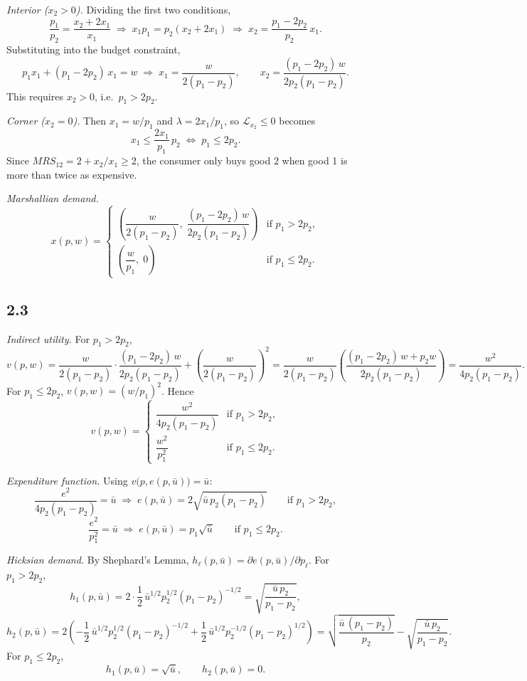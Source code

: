 \documentclass[12pt,letterpaper]{article}
\begin{document}
\textit{Interior ($x_2>0$).} Dividing the first two conditions,
\[
\frac{p_1}{p_2} = \frac{x_2+2x_1}{x_1}
\;\Longrightarrow\; x_1p_1 = p_2(x_2+2x_1)
\;\Longrightarrow\; x_2 = \frac{p_1-2p_2}{p_2}\,x_1 .
\]
Substituting into the budget constraint,
\[
p_1x_1 + (p_1-2p_2)\,x_1 = w \;\Longrightarrow\; x_1 = \frac{w}{2(p_1-p_2)},
\qquad
x_2 = \frac{(p_1-2p_2)\,w}{2p_2(p_1-p_2)} .
\]
This requires $x_2>0$, i.e.\ $p_1>2p_2$.

\textit{Corner ($x_2=0$).} Then $x_1=w/p_1$ and $\lambda = 2x_1/p_1$, so $\mathcal{L}_{x_2}\le 0$ becomes
\[
x_1 \le \frac{2x_1}{p_1}\,p_2 \;\Longleftrightarrow\; p_1 \le 2p_2 .
\]
Since $MRS_{12} = 2 + x_2/x_1 \ge 2$, the consumer only buys good 2 when good 1 is more than twice as expensive.

\textit{Marshallian demand.}
\[
x(p,w) = \begin{cases}
\left(\dfrac{w}{2(p_1-p_2)},\; \dfrac{(p_1-2p_2)\,w}{2p_2(p_1-p_2)}\right) & \text{if } p_1>2p_2,\\[14pt]
\left(\dfrac{w}{p_1},\; 0\right) & \text{if } p_1\le 2p_2 .
\end{cases}
\]

\subsection*{2.3}

\textit{Indirect utility.} For $p_1>2p_2$,
\[
v(p,w) = \frac{w}{2(p_1-p_2)}\cdot\frac{(p_1-2p_2)\,w}{2p_2(p_1-p_2)} + \left(\frac{w}{2(p_1-p_2)}\right)^2
= \frac{w}{2(p_1-p_2)}\left(\frac{(p_1-2p_2)\,w + p_2w}{2p_2(p_1-p_2)}\right)
= \frac{w^2}{4p_2(p_1-p_2)} .
\]
For $p_1\le 2p_2$, $v(p,w) = (w/p_1)^2$. Hence
\[
v(p,w) = \begin{cases}
\dfrac{w^2}{4p_2(p_1-p_2)} & \text{if } p_1>2p_2,\\[12pt]
\dfrac{w^2}{p_1^2} & \text{if } p_1\le 2p_2 .
\end{cases}
\]

\textit{Expenditure function.} Using $v\big(p,e(p,\bar u)\big)=\bar u$:
\[
\frac{e^2}{4p_2(p_1-p_2)} = \bar u \;\Longrightarrow\; e(p,\bar u) = 2\sqrt{\bar u\,p_2(p_1-p_2)} \qquad \text{if } p_1>2p_2,
\]
\[
\frac{e^2}{p_1^2} = \bar u \;\Longrightarrow\; e(p,\bar u) = p_1\sqrt{\bar u} \qquad \text{if } p_1\le 2p_2 .
\]

\textit{Hicksian demand.} By Shephard's Lemma, $h_\ell(p,\bar u) = \partial e(p,\bar u)/\partial p_\ell$. For $p_1>2p_2$,
\[
h_1(p,\bar u) = 2\cdot\frac{1}{2}\,\bar u^{1/2}p_2^{1/2}(p_1-p_2)^{-1/2} = \sqrt{\frac{\bar u\,p_2}{p_1-p_2}},
\]
\[
h_2(p,\bar u) = 2\left(-\frac12\,\bar u^{1/2}p_2^{1/2}(p_1-p_2)^{-1/2} + \frac12\,\bar u^{1/2}p_2^{-1/2}(p_1-p_2)^{1/2}\right)
= \sqrt{\frac{\bar u\,(p_1-p_2)}{p_2}} - \sqrt{\frac{\bar u\,p_2}{p_1-p_2}} .
\]
For $p_1\le 2p_2$,
\[
h_1(p,\bar u) = \sqrt{\bar u}, \qquad h_2(p,\bar u) = 0 .
\]
\end{document}
